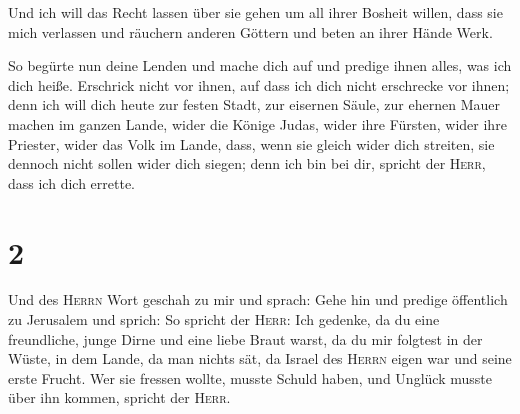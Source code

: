  Und ich will das Recht lassen über sie gehen um all
ihrer Bosheit willen, dass sie mich verlassen und räuchern anderen
Göttern und beten an ihrer Hände Werk.

 So begürte nun deine Lenden und mache dich auf und
predige ihnen alles, was ich dich heiße. Erschrick nicht vor ihnen, auf
dass ich dich nicht erschrecke vor ihnen;  denn ich will
dich heute zur festen Stadt, zur eisernen Säule, zur ehernen Mauer
machen im ganzen Lande, wider die Könige Judas, wider ihre Fürsten,
wider ihre Priester, wider das Volk im Lande,  dass, wenn
sie gleich wider dich streiten, sie dennoch nicht sollen wider dich
siegen; denn ich bin bei dir, spricht der \textsc{Herr}, dass ich dich
errette.

\hypertarget{section-1}{%
\section{2}\label{section-1}}

 Und des \textsc{Herrn} Wort geschah zu mir und sprach:
 Gehe hin und predige öffentlich zu Jerusalem und sprich:
So spricht der \textsc{Herr}: Ich gedenke, da du eine freundliche, junge
Dirne und eine liebe Braut warst, da du mir folgtest in der Wüste, in
dem Lande, da man nichts sät,  da Israel des
\textsc{Herrn} eigen war und seine erste Frucht. Wer sie fressen wollte,
musste Schuld haben, und Unglück musste über ihn kommen, spricht der
\textsc{Herr}.

